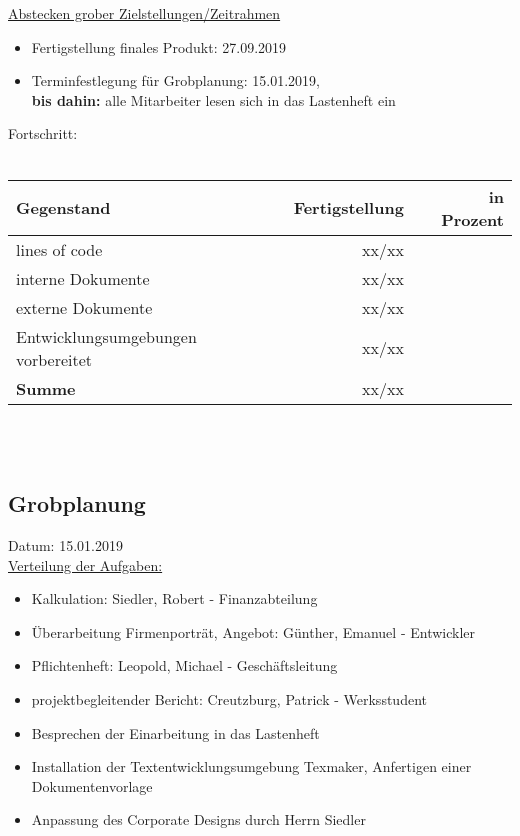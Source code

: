 \documentclass[12pt]{article}
\begin{document}
\uline{Abstecken grober Zielstellungen/Zeitrahmen}
\begin{itemize}\itemsep0em
\item Fertigstellung finales Produkt: 27.09.2019
\item Terminfestlegung für Grobplanung: 15.01.2019,\\
\textbf{bis dahin:} alle Mitarbeiter lesen sich in das Lastenheft ein\\
\end{itemize}



Fortschritt:\\\\
\begin{tabularx}{\textwidth}{|X|r|r|} \hline
\textbf{Gegenstand}&\textbf{Fertigstellung} & \textbf{in Prozent}\\ \hline
lines of code & xx/xx  & \\ \hline
interne Dokumente & xx/xx &  \\ \hline
externe Dokumente & xx/xx & \\ \hline
Entwicklungsumgebungen vorbereitet & xx/xx & \\ \hline
\textbf{Summe} & xx/xx &  \\ \hline
\end{tabularx}\\\\
\newpage

\subsection{Grobplanung}
Datum: 15.01.2019 \\

\uline{Verteilung der Aufgaben:}
\begin{itemize}\itemsep0em
\item Kalkulation: Siedler, Robert - Finanzabteilung
\item Überarbeitung Firmenporträt, Angebot: Günther, Emanuel - Entwickler
\item Pflichtenheft: Leopold, Michael - Geschäftsleitung
\item projektbegleitender Bericht: Creutzburg, Patrick - Werksstudent \\
\item Besprechen der Einarbeitung in das Lastenheft
\item Installation der Textentwicklungsumgebung Texmaker, Anfertigen einer Dokumentenvorlage
\item Anpassung des Corporate Designs durch Herrn Siedler\\
\end{itemize}
\end{document}
